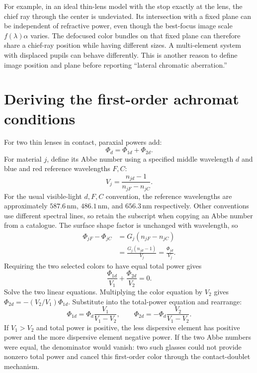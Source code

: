 For example, in an ideal thin-lens model with the stop exactly at the lens,
the chief ray through the center is undeviated. Its intersection with a fixed
plane can be independent of refractive power, even though the best-focus
image scale $f(\lambda)\alpha$ varies. The defocused color bundles on that
fixed plane can therefore share a chief-ray position while having different
sizes. A multi-element system with displaced pupils can behave differently.
This is another reason to define image position and plane before reporting
``lateral chromatic aberration.''

\section{Deriving the first-order achromat conditions}
For two thin lenses in contact, paraxial powers add:
\begin{equation}
 \Phi_d=\Phi_{1d}+\Phi_{2d}.
 \label{ab:achropower}
\end{equation}
For material $j$, define its Abbe number using a specified middle wavelength
$d$ and blue and red reference wavelengths $F,C$:
\begin{equation}
V_j=\frac{n_{jd}-1}{n_{jF}-n_{jC}}.
\end{equation}
For the usual visible-light $d,F,C$ convention, the reference wavelengths are
approximately $587.6\,\mathrm{nm}$, $486.1\,\mathrm{nm}$, and
$656.3\,\mathrm{nm}$ respectively. Other conventions use different spectral
lines, so retain the subscript when copying an Abbe number from a catalogue.
The surface shape factor is unchanged with wavelength, so
\begin{align}
 \Phi_{jF}-\Phi_{jC}
 &=G_j(n_{jF}-n_{jC})\\
 &=\frac{G_j(n_{jd}-1)}{V_j}
   =\frac{\Phi_{jd}}{V_j}.
\end{align}
Requiring the two selected colors to have equal total power gives
\begin{equation}
 \boxed{\frac{\Phi_{1d}}{V_1}+\frac{\Phi_{2d}}{V_2}=0.}
 \label{ab:achrocolor}
\end{equation}
Solve the two linear equations. Multiplying the color equation by $V_2$
gives $\Phi_{2d}=-(V_2/V_1)\Phi_{1d}$. Substitute into the total-power
equation and rearrange:
\begin{equation}
 \boxed{\Phi_{1d}=\Phi_d\frac{V_1}{V_1-V_2},\qquad
 \Phi_{2d}=-\Phi_d\frac{V_2}{V_1-V_2}.}
 \label{ab:achrosolution}
\end{equation}
If $V_1>V_2$ and total power is positive, the less dispersive element has
positive power and the more dispersive element negative power. If the two
Abbe numbers were equal, the denominator would vanish: two such glasses
could not provide nonzero total power and cancel this first-order color
through the contact-doublet mechanism.

